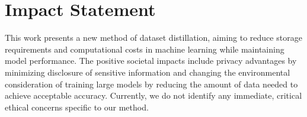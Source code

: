 \section*{Impact Statement}

This work presents a new method of dataset distillation, aiming to reduce storage requirements and computational costs in machine learning while maintaining model performance. The positive societal impacts include privacy advantages by minimizing disclosure of sensitive information and changing the environmental consideration of training large models by reducing the amount of data needed to achieve acceptable accuracy. Currently, we do not identify any immediate, critical ethical concerns specific to our method. 